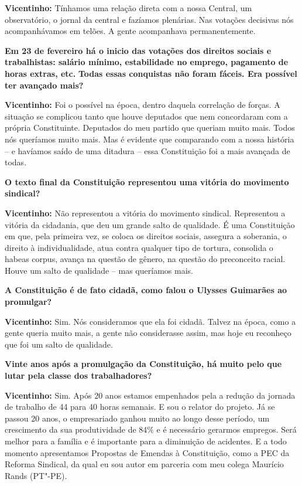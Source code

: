 \textbf{Vicentinho:} Tínhamos uma relação direta com a nossa Central, um
observatório, o jornal da central e fazíamos plenárias. Nas votações
decisivas nós acompanhávamos em telões. A gente acompanhava
permanentemente.

\textbf{Em 23 de fevereiro há o inicio das votações dos direitos sociais
e trabalhistas: salário mínimo, estabilidade no emprego, pagamento de
horas extras, etc.} \textbf{Todas essas conquistas não foram fáceis. Era
possível ter avançado mais?}

\textbf{Vicentinho:} Foi o possível na época, dentro daquela correlação
de forças. A situação se complicou tanto que houve deputados que nem
concordaram com a própria Constituinte. Deputados do meu partido que
queriam muito mais. Todos nós queríamos muito mais. Mas é evidente que
comparando com a nossa história -- e havíamos saído de uma ditadura --
essa Constituição foi a mais avançada de todas.

\textbf{O texto final da Constituição representou uma vitória do
movimento sindical?}

\textbf{Vicentinho:} Não representou a vitória do movimento sindical.
Representou a vitória da cidadania, que deu um grande salto de
qualidade. É uma Constituição em que, pela primeira vez, se coloca os
direitos sociais, assegura a soberania, o direito à individualidade,
atua contra qualquer tipo de tortura, consolida o habeas corpus, avança
na questão de gênero, na questão do preconceito racial. Houve um salto
de qualidade -- mas queríamos mais.

\textbf{A Constituição é de fato cidadã, como falou o Ulysses Guimarães
ao promulgar?}

\textbf{Vicentinho:} Sim. Nós consideramos que ela foi cidadã. Talvez na
época, como a gente queria muito mais, a gente não considerasse assim,
mas hoje eu reconheço que foi um salto de qualidade.

\textbf{Vinte anos após a promulgação da Constituição, há muito pelo que
lutar pela classe dos trabalhadores?}

\textbf{Vicentinho:} Sim. Após 20 anos estamos empenhados pela a redução
da jornada de trabalho de 44 para 40 horas semanais. E sou o relator do
projeto. Já se passou 20 anos, o empresariado ganhou muito ao longo
desse período, um crescimento da sua produtividade de 84\% e é
necessário gerarmos empregos. Será melhor para a família e é importante
para a diminuição de acidentes. E a todo momento apresentamos Propostas
de Emendas à Constituição, como a PEC da Reforma Sindical, da qual eu
sou autor em parceria com meu colega Maurício Rands (PT"-PE).

